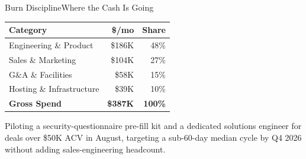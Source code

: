 \begin{frame}{Burn Discipline}{Where the Cash Is Going}

  \centering
  {\small{}
  \renewcommand{\arraystretch}{1.15}
  \begin{tabular}{l r r}
    \toprule
    \rowcolor{panelBg}
    \textcolor{textLight}{\textbf{Category}} & \textcolor{textLight}{\textbf{\$/mo}} & \textcolor{textLight}{\textbf{Share}} \\
    \midrule
    Engineering \& Product     & \$186K & 48\% \\
    \rowcolor{panelBg}
    Sales \& Marketing         & \$104K & 27\% \\
    G\&A \& Facilities         & \$58K  & 15\% \\
    \rowcolor{panelBg}
    Hosting \& Infrastructure  & \$39K  & 10\% \\
    \midrule
    \textbf{Gross Spend}       & \textbf{\$387K} & \textbf{100\%} \\
    \bottomrule
  \end{tabular}}

  \vspace{0.2cm}
  \begin{calloutbox}[title={\textcolor{riskAmber}{\faSearch}\ \ Mitigation: Enterprise Sales Cycle}]
    \scriptsize
    Piloting a security-questionnaire pre-fill kit and a dedicated solutions engineer for
    deals over \$50K ACV in August, targeting a sub-60-day median cycle by Q4 2026 without
    adding sales-engineering headcount.
  \end{calloutbox}

\end{frame}
